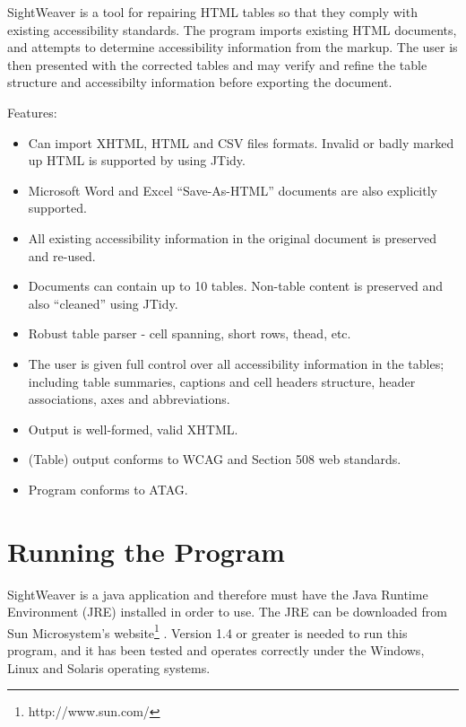 
SightWeaver is a tool for repairing HTML tables so that they comply with
existing accessibility standards. The program imports existing HTML documents,
and attempts to determine accessibility information from the markup. The user
is then presented with the corrected tables and may verify and refine the table
structure and accessibilty information before exporting the document.

Features:

\begin{itemize}

\item Can import XHTML, HTML and CSV files formats. Invalid or badly marked up HTML is supported by using JTidy.

\item Microsoft Word and Excel ``Save-As-HTML'' documents are also explicitly supported.

\item All existing accessibility information in the original document is preserved and re-used.

\item Documents can contain up to 10 tables. Non-table content is preserved and also ``cleaned'' using JTidy.

\item Robust table parser - cell spanning, short rows, thead, etc.

\item The user is given full control over all accessibility information in the tables; including table summaries, captions and cell headers structure, header associations, axes and abbreviations.

\item Output is well-formed, valid XHTML.

\item (Table) output conforms to WCAG and Section 508 web standards.

\item Program conforms to ATAG.

\end{itemize}

\section*{Running the Program}

SightWeaver is a java application and therefore must have the Java Runtime
Environment (JRE) installed in order to use. The JRE can be downloaded from Sun
Microsystem's website\footnote{http://www.sun.com/} . Version 1.4 or greater is
needed to run this program, and it has been tested and operates correctly under
the Windows, Linux and Solaris operating systems.

